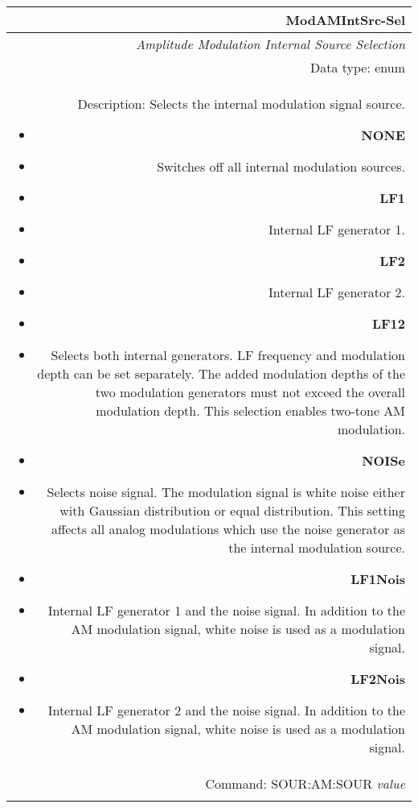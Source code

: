\documentclass[openany]{article}
\begin{document}
		\begin{tabular}{N}
			\hline
			\bfseries ModAMIntSrc-Sel \\ \hline
			\emph{Amplitude Modulation Internal Source Selection} \\
			Data type: enum \\  
			Description: Selects the internal modulation signal source.\begin{itemize}[noitemsep]
				\small
				\item[] \textbf{NONE}
				\item[] Switches off all internal modulation sources.
				\item[] \textbf{LF1}
				\item[]	Internal LF generator 1.
				\item[] \textbf{LF2} 
				\item[]	Internal LF generator 2.
				\item[] \textbf{LF12} 
				\item[]	Selects both internal generators. LF frequency and modulation depth can be set separately. The added modulation depths of the two modulation generators must not exceed the overall modulation depth. This selection enables two-tone AM modulation.
				\item[] \textbf{NOISe} 
				\item[]	Selects noise signal. The modulation signal is white noise either with Gaussian distribution or equal distribution. This setting affects all analog modulations which use the noise generator as the internal modulation source.
				\item[] \textbf{LF1Nois} 
				\item[]	Internal LF generator 1 and the noise signal. In addition to the AM modulation signal, white noise is used as a modulation signal.
				\item[] \textbf{LF2Nois} 
				\item[]	Internal LF generator 2 and the noise signal. In addition to the AM modulation signal, white noise is used as a modulation signal.

			\end{itemize} \\
			Command: SOUR:AM:SOUR \emph{value} \\
			\\

		\end{tabular}
\end{document}
